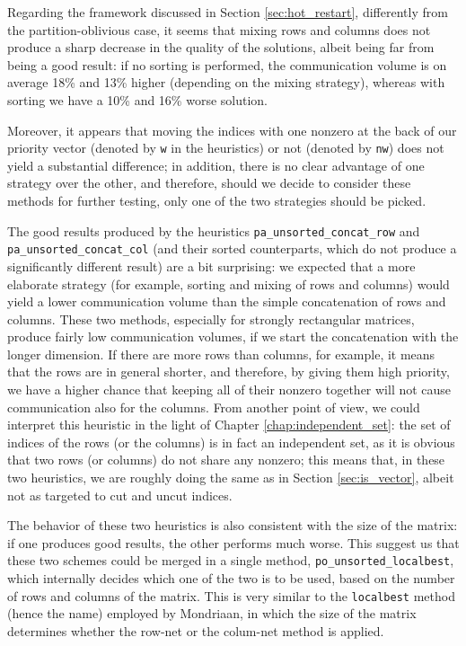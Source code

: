 Regarding the framework discussed in Section \ref{sec:hot_restart}, differently from the partition-oblivious case, it seems that mixing rows and columns does not produce a sharp decrease in the quality of the solutions, albeit being far from being a good result: if no sorting is performed, the communication volume is on average 18\% and 13\% higher (depending on the mixing strategy), whereas with sorting we have a 10\% and 16\% worse solution.

Moreover, it appears that moving the indices with one nonzero at the back of our priority vector (denoted by \verb|w| in the heuristics) or not (denoted by \verb|nw|) does not yield a substantial difference; in addition, there is no clear advantage of one strategy over the other, and therefore, should we decide to consider these methods for further testing, only one of the two strategies should be picked.

The good results produced by the heuristics \verb|pa_unsorted_concat_row| and \verb|pa_unsorted_concat_col| (and their sorted counterparts, which do not produce a significantly different result) are a bit surprising: we expected that a more elaborate strategy (for example, sorting and mixing of rows and columns) would yield a lower communication volume than the simple concatenation of rows and columns. These two methods, especially for strongly rectangular matrices, produce fairly low communication volumes, if we start the concatenation with the longer dimension. If there are more rows than columns, for example, it means that the rows are in general shorter, and therefore, by giving them high priority, we have a higher chance that keeping all of their nonzero together will not cause communication also for the columns. From another point of view, we could interpret this heuristic in the light of Chapter \ref{chap:independent_set}: the set of indices of the rows (or the columns) is in fact an independent set, as it is obvious that two rows (or columns) do not share any nonzero; this means that, in these two heuristics, we are roughly doing the same as in Section \ref{sec:is_vector}, albeit not as targeted to cut and uncut indices. 

The behavior of these two heuristics is also consistent with the size of the matrix: if one produces good results, the other performs much worse. This suggest us that these two schemes could be merged in a single method, \verb|po_unsorted_localbest|, which internally decides which one of the two is to be used, based on the number of rows and columns of the matrix. This is very similar to the \verb|localbest| method (hence the name) employed by Mondriaan, in which the size of the matrix determines whether the row-net or the colum-net method is applied.

